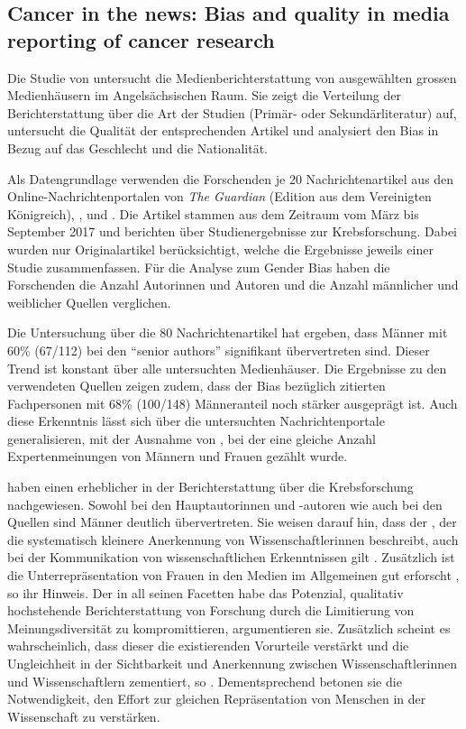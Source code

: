 \subsection{Cancer in the news: Bias and quality in media reporting of cancer research}

Die Studie  von \citeauthor{cancer-in-the-news} \cite{cancer-in-the-news}
untersucht die Medienberichterstattung von ausgewählten grossen Medienhäusern im Angelsächsischen Raum.
Sie zeigt die Verteilung der Berichterstattung über die Art der Studien (Primär- oder Sekundärliteratur) auf,
untersucht die Qualität der entsprechenden Artikel und analysiert den Bias in Bezug auf das Geschlecht und die
Nationalität.

Als Datengrundlage verwenden die Forschenden je 20 Nachrichtenartikel aus den Online-Nachrichtenportalen von
\textsl{The Guardian} (Edition aus dem Vereinigten Königreich), ,  und . 
Die Artikel stammen aus dem Zeitraum vom März bis September 2017 und berichten über Studienergebnisse zur Krebsforschung. 
Dabei wurden nur Originalartikel berücksichtigt, welche die Ergebnisse jeweils einer Studie zusammenfassen. 
Für die Analyse zum Gender Bias haben die Forschenden die Anzahl Autorinnen und Autoren und die Anzahl
männlicher und weiblicher Quellen verglichen.

Die Untersuchung über die 80 Nachrichtenartikel hat ergeben, dass Männer mit 60\% (67/112) bei den \enquote{senior authors}
signifikant übervertreten sind. Dieser Trend ist konstant über alle untersuchten Medienhäuser.
Die Ergebnisse zu den verwendeten Quellen zeigen zudem, dass der Bias bezüglich zitierten Fachpersonen mit 68\% (100/148) Männeranteil
noch stärker ausgeprägt ist. Auch diese Erkenntnis lässt sich über die untersuchten Nachrichtenportale generalisieren, mit der Ausnahme von
, bei der eine gleiche Anzahl Expertenmeinungen von Männern und Frauen gezählt wurde.

\citeauthor{cancer-in-the-news} haben einen erheblicher  in der Berichterstattung über die Krebsforschung
nachgewiesen. Sowohl bei den Hauptautorinnen und -autoren wie auch bei den Quellen sind Männer deutlich übervertreten. Sie weisen darauf hin, dass der
, der die systematisch kleinere Anerkennung von Wissenschaftlerinnen beschreibt, auch bei der Kommunikation von
wissenschaftlichen Erkenntnissen gilt \cite{rossiter1993matthew,knobloch2013matilda}. Zusätzlich ist die Unterrepräsentation von Frauen in den Medien
im Allgemeinen gut erforscht \cite{10.1371/journal.pone.0148434,ross2011women}, so ihr Hinweis. Der  in all seinen Facetten habe
das Potenzial, qualitativ hochstehende Berichterstattung von Forschung durch die Limitierung von Meinungsdiversität zu kompromittieren, argumentieren sie.
Zusätzlich scheint es wahrscheinlich, dass dieser die existierenden Vorurteile verstärkt und die Ungleichheit in der Sichtbarkeit und Anerkennung zwischen
Wissenschaftlerinnen und Wissenschaftlern zementiert, so \citeauthor{cancer-in-the-news}. Dementsprechend betonen sie die Notwendigkeit, den
Effort zur gleichen Repräsentation von Menschen in der Wissenschaft zu verstärken.